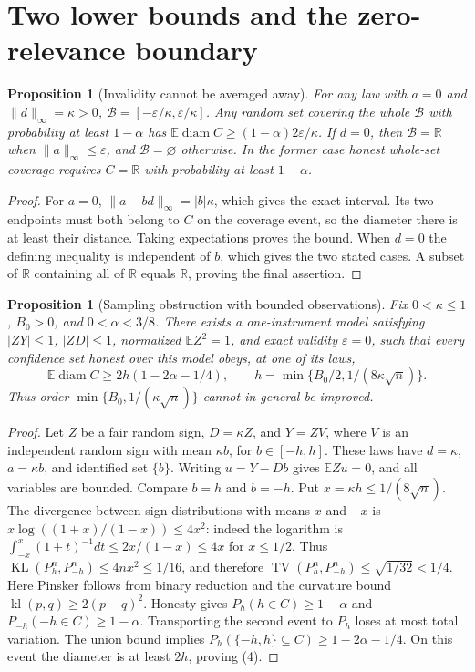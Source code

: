 \documentclass[11pt]{article}
\newtheorem{proposition}[theorem]{Proposition}
\theoremstyle{remark}
\newcommand{\E}{\mathbb E}
\newcommand{\R}{\mathbb R}
\newcommand{\TV}{\operatorname{TV}}
\newcommand{\KL}{\operatorname{KL}}
\newcommand{\diam}{\operatorname{diam}}
\begin{document}
\section{Two lower bounds and the zero-relevance boundary}
\begin{proposition}[Invalidity cannot be averaged away]
For any law with $a=0$ and $\|d\|_\infty=\kappa>0$,
$\mathcal B=[-\varepsilon/\kappa,\varepsilon/\kappa]$.
Any random set covering the whole $\mathcal B$ with probability at least
$1-\alpha$ has
$\E\diam C\geq(1-\alpha)2\varepsilon/\kappa$.
If $d=0$, then $\mathcal B=\R$ when $\|a\|_\infty\leq\varepsilon$,
and $\mathcal B=\varnothing$ otherwise. In the former case honest whole-set
coverage requires $C=\R$ with probability at least $1-\alpha$.
\end{proposition}
\begin{proof}
For $a=0$, $\|a-bd\|_\infty=|b|\kappa$, which gives the exact interval.
Its two endpoints must both belong to $C$ on the coverage event, so the
diameter there is at least their distance. Taking expectations proves
the bound. When $d=0$ the defining inequality is independent of $b$,
which gives the two stated cases. A subset of $\R$ containing all of
$\R$ equals $\R$, proving the final assertion.
\end{proof}

\begin{proposition}[Sampling obstruction with bounded observations]
Fix $0<\kappa\leq1$, $B_0>0$, and $0<\alpha<3/8$. There exists a
one-instrument model satisfying $|ZY|\leq1$, $|ZD|\leq1$, normalized
$\E Z^2=1$, and exact validity $\varepsilon=0$, such that every confidence
set honest over this model obeys, at one of its laws,
\[
 \E\diam C\geq
 2h(1-2\alpha-1/4),\qquad
 h=\min\{B_0/2,1/(8\kappa\sqrt n)\}. \tag{4}
\]
Thus order $\min\{B_0,1/(\kappa\sqrt n)\}$ cannot in general be improved.
\end{proposition}
\begin{proof}
Let $Z$ be a fair random sign, $D=\kappa Z$, and $Y=ZV$, where $V$ is
an independent random sign with mean $\kappa b$, for $b\in[-h,h]$.
These laws have $d=\kappa$, $a=\kappa b$, and identified set $\{b\}$.
Writing $u=Y-Db$ gives $\E Zu=0$, and all variables are bounded.
Compare $b=h$ and $b=-h$. Put $x=\kappa h\leq1/(8\sqrt n)$.
The divergence between sign distributions with means $x$ and $-x$ is
$x\log((1+x)/(1-x))\leq4x^2$: indeed the logarithm is
$\int_{-x}^x(1+t)^{-1}dt\leq2x/(1-x)\leq4x$ for $x\leq1/2$.
Thus
$\KL(P_h^n,P_{-h}^n)\leq4nx^2\leq1/16$, and therefore
$\TV(P_h^n,P_{-h}^n)\leq\sqrt{1/32}<1/4$.
Here Pinsker follows from binary reduction and the curvature bound
$\operatorname{kl}(p,q)\geq2(p-q)^2$.
Honesty gives $P_h(h\in C)\geq1-\alpha$ and
$P_{-h}(-h\in C)\geq1-\alpha$. Transporting the second event to $P_h$
loses at most total variation. The union bound implies
$P_h(\{-h,h\}\subseteq C)\geq1-2\alpha-1/4$.
On this event the diameter is at least $2h$, proving (4).
\end{proof}
\end{document}
